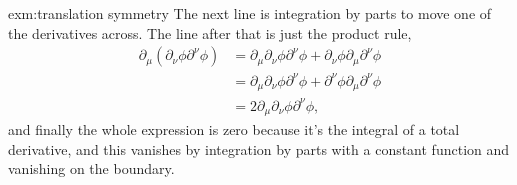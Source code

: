 \documentclass[fleqn]{NotesClass}
\begin{document}
\begin{exm}{}{exm:translation symmetry}
         The next line is integration by parts to move one of the derivatives across.
         The line after that is just the product rule,
         \begin{align}
             \partial_\mu(\partial_\nu \phi \partial^\nu \phi) &= \partial_\mu \partial_\nu \phi \partial^\nu \phi + \partial_\nu \phi \partial_\mu \partial^\nu\phi\\
             &= \partial_\mu \partial_\nu \phi \partial^\nu \phi + \partial^\nu \phi \partial_\mu \partial^\nu\phi\\
             &= 2\partial_\mu \partial_\nu \phi \partial^\nu \phi,
         \end{align}
         and finally the whole expression is zero because it's the integral of a total derivative, and this vanishes by integration by parts with a constant function and vanishing on the boundary.
    \end{exm}
    
\end{document}
